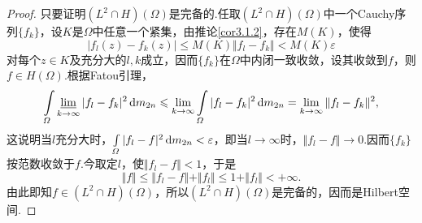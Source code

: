\begin{proof}
	只要证明$(L^2\cap H)(\Omega)$是完备的.任取$(L^2\cap H)(\Omega)$中一个Cauchy序列$\{f_k\}$，设$K$是$\Omega$中任意一个紧集，由推论\ref{cor3.1.2}，存在$M(K)$，使得
	\[|f_l(z)-f_k(z)|\le M(K)\Vert f_l-f_k\Vert<M(K)\varepsilon\]
	对每个$z\in K$及充分大的$l,k$成立，因而$\{f_k\}$在$\Omega$中内闭一致收敛，设其收敛到$f$，则$f\in H(\Omega)$.根据Fatou引理，
	\[\int\limits_\varOmega\varliminf_{k\to\infty}|f_l-f_k|^2\mathop{}\!\mathrm{d} m_{2n}\leqslant\lim_{k\to\infty}\int\limits_\varOmega|f_l-f_k|^2\mathop{}\!\mathrm{d} m_{2n}=\lim_{k\to\infty}\Vert f_l-f_k\Vert^2,\]
	这说明当$l$充分大时，$\int\limits_\varOmega|f_l-f|^2\mathop{}\!\mathrm{d} m_{2n}<\varepsilon$，即当$l\to\infty$时，$\Vert f_l-f\Vert\to0$.因而$\{f_k\}$按范数收敛于$f$.今取定$l$，使$\Vert f_l-f\Vert<1$，于是
	\[\Vert f\Vert\le\Vert f_l-f\Vert+\Vert f_l\Vert\le1+\Vert f_l\Vert<+\infty.\]
	由此即知$f\in(L^2\cap H)(\Omega)$，所以$(L^2\cap H)(\Omega)$是完备的，因而是Hilbert空间.
\end{proof}

